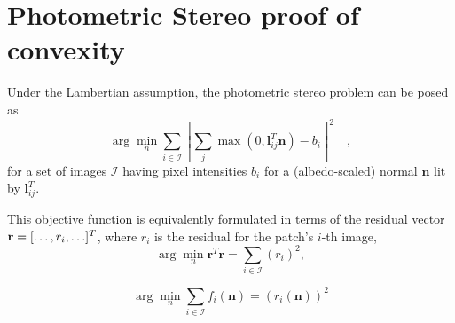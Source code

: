 \chapter{Photometric Stereo proof of convexity}     %
\label{annex2}


Under the Lambertian assumption, the photometric stereo problem can be posed as
\begin{equation}
\arg\min_n \sum_{i \in \mathcal{I}} \left[\sum_j \max\left(0, \mathbf{l}_{ij}^T \mathbf{n} \right) - b_i \right]^2 \quad ,
\label{eq:init} 
\end{equation}
for a set of images $\mathcal{I}$ having pixel intensities $b_{i}$ for a (albedo-scaled) normal $\mathbf{n}$ lit by $\mathbf{l}_{ij}^T$.

This objective function is equivalently formulated in terms of the residual vector ${\bf r} = [\ldots , {r_i}, \ldots]^T$, where $r_i$ is the residual for the patch's $i$-th image,
\begin{equation}
\arg\min_n  \mathbf{r}^T\mathbf{r} = \sum_{i \in \mathcal{I}} (r_i)^2, 
\end{equation}

\begin{equation}
\arg\min_n \sum_{i \in \mathcal{I}} f_i(\mathbf{n})
 = (r_i(\mathbf{n}))^2 
\end{equation}

